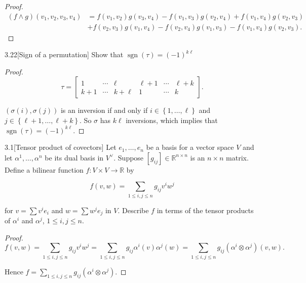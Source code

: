 \begin{proof}
    \begingroup
    \allowdisplaybreaks%
    \begin{align*}
        (f \wedge g)(v_{1}, v_{2}, v_{3}, v_{4}) & = f(v_{1}, v_{2})g(v_{3}, v_{4}) - f(v_{1}, v_{3})g(v_{2}, v_{4}) + f(v_{1}, v_{4})g(v_{2}, v_{3})  \\
                                                 & + f(v_{2}, v_{3})g(v_{1}, v_{4}) - f(v_{2}, v_{4})g(v_{1}, v_{3}) - f(v_{1}, v_{4})g(v_{2}, v_{3}).
    \end{align*}
    \endgroup
\end{proof}

\begin{exercise}{3.22}[Sign of a permutation]
    Show that \( \operatorname{sgn}(\tau) = {(-1)}^{k\ell} \)
\end{exercise}

\begin{proof}
    \[
        \tau = \begin{bmatrix}
            1     & \cdots & \ell     & \ell + 1 & \cdots & \ell + k \\
            k + 1 & \cdots & k + \ell & 1        & \cdots & k
        \end{bmatrix}.
    \]

    \( (\sigma(i), \sigma(j)) \) is an inversion if and only if \( i \in \left\{ 1, \ldots, \ell \right\} \) and \( j \in \left\{ \ell + 1, \ldots, \ell + k \right\} \). So \( \sigma \) has \( k\ell \) inversions, which implies that \( \operatorname{sgn}(\tau) = {(-1)}^{k\ell} \).
\end{proof}

\begin{problem}{3.1}[Tensor product of covectors]
Let \( e_{1}, \ldots, e_{n} \) be a basis for a vector space \( V \) and let \( \alpha^{1}, \ldots, \alpha^{n} \) be its dual basis in \( V^{\vee} \). Suppose \( [g_{ij}] \in \mathbb{R}^{n \times n} \) is an \( n \times n \) matrix. Define a bilinear function \( f \colon V \times V \to \mathbb{R} \) by

\[
    f(v, w) = \sum_{1 \leq i, j \leq n} g_{ij} v^{i} w^{j}
\]

for \( v = \sum v^{i} e_{i} \) and \( w = \sum w^{j} e_{j} \) in \( V \). Describe \( f \) in terms of the tensor products of \( \alpha^{i} \) and \( \alpha^{j} \), \( 1 \leq i, j \leq n \).
\end{problem}

\begin{proof}
    \[
        f(v, w) = \sum_{1\leq i, j\leq n} g_{ij}v^{i}w^{j} = \sum_{1\leq i, j\leq n} g_{ij} \alpha^{i}(v)\alpha^{j}(w) = \sum_{1\leq i, j\leq n} g_{ij} (\alpha^{i}\otimes \alpha^{j})(v, w).
    \]

    Hence \( f = \sum_{1\leq i, j \leq n} g_{ij} (\alpha^{i} \otimes \alpha^{j}) \).
\end{proof}

